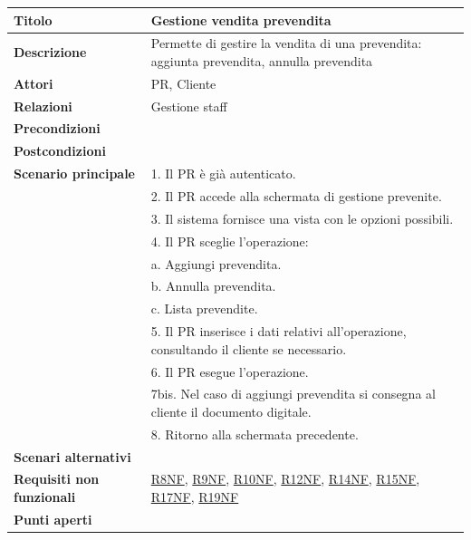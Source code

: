 \documentclass[a4paper]{article}
\begin{document}
\begin{center}
\begin{tabularx}{1\textwidth}{|l|X|}
    \hline
	\textbf{Titolo} & Gestione vendita prevendita \\
	\hline
	\textbf{Descrizione} & Permette di gestire la vendita di una prevendita: aggiunta prevendita, annulla prevendita \\
	\hline
	\textbf{Attori} & PR, Cliente \\
	\hline
	\textbf{Relazioni} & Gestione staff \\
	\hline
	\textbf{Precondizioni} &  \\
	\hline
	\textbf{Postcondizioni} &  \\
	\hline
	\textbf{Scenario principale} & 1. Il PR è già autenticato.\\
	                             & 2. Il PR accede alla schermata di gestione prevenite. \\
								 & 3. Il sistema fornisce una vista con le opzioni possibili. \\
								 & 4. Il PR sceglie l'operazione:\\
								 & \quad a. Aggiungi prevendita.\\
								 & \quad b. Annulla prevendita.\\
								 & \quad c. Lista prevendite.\\
								 & 5. Il PR inserisce i dati relativi all'operazione, consultando il cliente se necessario.\\
								 & 6. Il PR esegue l'operazione.\\
								 & 7bis. Nel caso di aggiungi prevendita si consegna al cliente il documento digitale.\\
								 & 8. Ritorno alla schermata precedente.\\
	\hline
	\textbf{Scenari alternativi} & \\
	\hline
	\textbf{Requisiti non funzionali} & \hyperlink{R8NF}{R8NF}, \hyperlink{R9NF}{R9NF}, \hyperlink{R10NF}{R10NF}, \hyperlink{R12NF}{R12NF}, \hyperlink{R14NF}{R14NF}, \hyperlink{R15NF}{R15NF}, \hyperlink{R17NF}{R17NF}, \hyperlink{R19NF}{R19NF}  \\
	\hline
	\textbf{Punti aperti} & \\
	\hline
\end{tabularx}
\end{center}

\end{document}
